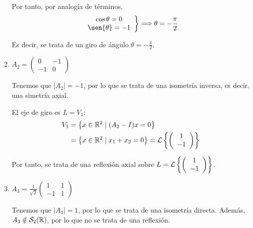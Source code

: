 \begin{ejercicio}
\begin{enumerate}
        Por tanto, por analogía de términos,
        \begin{equation*}
            \left.\begin{array}{c}
                \cos{\theta} = 0 \\
                \sen{\theta} = -1
            \end{array}\right\} \Longrightarrow \theta = -\frac{\pi}{2}
        \end{equation*}
        
        Es decir, se trata de un giro de ángulo $\theta=-\frac{\pi}{2}$.

        \item $A_2=\left(\begin{array}{cc}
            0 & -1 \\
            -1 & 0
        \end{array}\right)$

        Tenemos que $|A_2|=-1$, por lo que se trata de una isometría inversa, es decir, una simetría axial.

        El eje de giro es $L=V_1$:
        \begin{equation*}
            \begin{split}
                V_1& = \left\{x\in \mathbb{R}^2 \mid (A_2-I)x=0\right\}\\
                & = \left\{x\in \mathbb{R}^2 \mid x_1+x_2=0\right\} = \mathcal{L}\left\{\left(\begin{array}{c}
                     1 \\ -1
                \end{array}\right)\right\}\\
            \end{split}
        \end{equation*}

        Por tanto, se trata de una reflexión axial sobre $L=\mathcal{L}\left\{\left(\begin{array}{c}
                     1 \\ -1
                \end{array}\right)\right\}$.


        \item $A_3=\frac{1}{\sqrt{2}}\left(\begin{array}{cc}
            1 & 1 \\
            -1 & 1
        \end{array}\right)$

        Tenemos que $|A_3|=1$, por lo que se trata de una isometría directa. Además, $A_3\notin \mathcal{S}_2(\mathbb{R})$, por lo que no se trata de una reflexión.


\end{enumerate}
\end{ejercicio}
